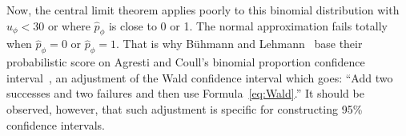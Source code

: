 \documentclass[conference]{IEEEtran}
\begin{document}
Now, the central limit theorem applies poorly to this binomial distribution
with $u_\phi<30$ or where $\hat{p}_\phi$ is close to 0 or 1.
The normal approximation fails totally when $\hat{p}_\phi = 0$ or $\hat{p}_\phi = 1$.
That is why B\"uhmann and Lehmann~\cite{BuehmannLehmann2012} base their probabilistic score
on Agresti and Coull's binomial proportion confidence interval~\cite{AgrestiCoull1998},
an adjustment of the Wald confidence interval which goes: ``Add two successes and two failures
and then use Formula~\ref{eq:Wald}.'' It should be observed, however, that
such adjustment is specific for constructing 95\% confidence intervals.

\end{document}
